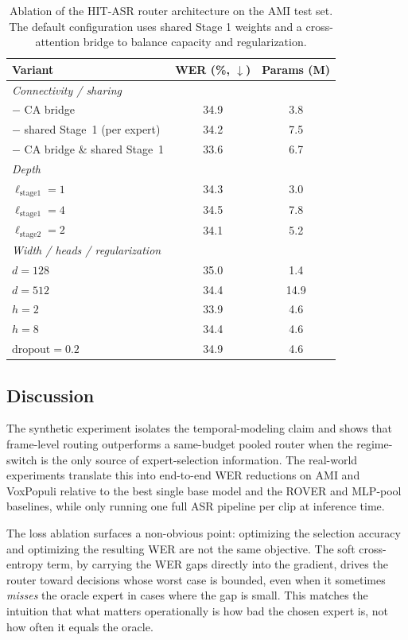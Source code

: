 \documentclass[journal]{IEEEtran}
\begin{document}
\begin{table}[t]
\centering
\caption{Ablation of the HIT-ASR router architecture on the AMI test set. The default configuration uses shared Stage 1 weights and a cross-attention bridge to balance capacity and regularization.}
\label{tab:arch_ablation}
\small
\begin{tabular}{p{4.5cm} S[table-format=2.1] S[table-format=2.1]}
\toprule
\textbf{Variant} & {\textbf{WER (\%, $\downarrow$)}} & {\textbf{Params (M)}} \\
\midrule
\textit{Connectivity / sharing} & & \\
$-$ CA bridge & 34.9 & 3.8 \\
$-$ shared Stage~1 (per expert) & 34.2 & 7.5 \\
$-$ CA bridge \& shared Stage~1 & 33.6 & 6.7 \\
\midrule
\textit{Depth} & & \\
$\ell_{\text{stage1}}=1$ & 34.3 & 3.0 \\
$\ell_{\text{stage1}}=4$ & 34.5 & 7.8 \\
$\ell_{\text{stage2}}=2$ & 34.1 & 5.2 \\
\midrule
\textit{Width / heads / regularization} & & \\
$d=128$ & 35.0 & 1.4 \\
$d=512$ & 34.4 & 14.9 \\
$h=2$ & 33.9 & 4.6 \\
$h=8$ & 34.4 & 4.6 \\
$\text{dropout}=0.2$ & 34.9 & 4.6 \\
\bottomrule
\end{tabular}
\end{table}


\subsection{Discussion}
\label{subsec:discussion}

The synthetic experiment isolates the temporal-modeling claim and
shows that frame-level routing outperforms a same-budget pooled
router when the regime-switch is the only source of expert-selection
information. The real-world experiments translate this into
end-to-end WER reductions on AMI and VoxPopuli relative to the best
single base model and the ROVER and MLP-pool baselines, while only
running one full ASR pipeline per clip at inference time.

The loss ablation surfaces a non-obvious point: optimizing the
selection accuracy and optimizing the resulting WER are not the
same objective. The soft cross-entropy term, by carrying the WER
gaps directly into the gradient, drives the router toward decisions
whose worst case is bounded, even when it sometimes \emph{misses}
the oracle expert in cases where the gap is small. This matches the
intuition that what matters operationally is how bad the chosen
expert is, not how often it equals the oracle.
\end{document}
